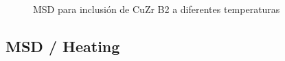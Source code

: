 \documentclass[10pt, oneside]{article} %
\begin{document}
\begin{figure}[H]
\centering
{}
\\
\caption[MSD para inclusión de CuZr B2 a diferentes temperaturas]{MSD para inclusión de CuZr B2 a diferentes temperaturas}
\label{C4:fg:msd_CuZr_B2}
\end{figure}

\subsection{MSD / Heating}
\end{document}
